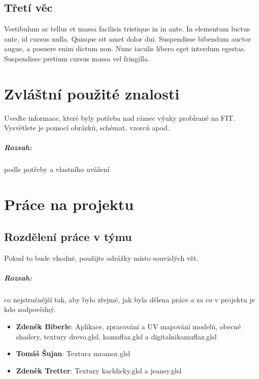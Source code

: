 \documentclass[12pt,a4paper,titlepage,final]{report}
\newcommand\AuthorA{Zdeněk Biberle}
\newcommand\AuthorB{Tomáš Šujan}
\newcommand\AuthorC{Zdeněk Tretter}
\begin{document}
\section{Třetí věc}

Vestibulum ac tellus et massa facilisis tristique in in ante. In elementum luctus ante, id cursus nulla. Quisque sit amet dolor dui. Suspendisse bibendum auctor augue, a posuere enim dictum non. Nunc iaculis libero eget interdum egestas. Suspendisse pretium cursus massa vel fringilla. 
	


\chapter{Zvláštní použité znalosti}

Uveďte informace, které byly potřeba nad rámec výuky probírané na FIT.
Vysvětlete je pomocí obrázků, schémat, vzorců apod. 

\paragraph{Rozsah:} podle potřeby a vlastního uvážení


\chapter{Práce na projektu}

\section{Rozdělení práce v týmu}
Pokud to bude vhodné, použijte odrážky místo souvislých vět.

\paragraph{Rozsah:} co nejstručnější tak, aby bylo zřejmé, jak byla dělena práce a za co v
projektu je kdo zodpovědný.

\begin{itemize}
\item \textbf{\AuthorA}: Aplikace, zpracování a UV mapování modelů, obecné shadery, textury drevo.glsl, kamuflaz.glsl a digitalnikamuflaz.glsl
\item \textbf{\AuthorB}: Textura mramor.glsl
\item \textbf{\AuthorC}: Textury kachlicky.glsl a jeansy.glsl
\end{itemize}
\end{document}
